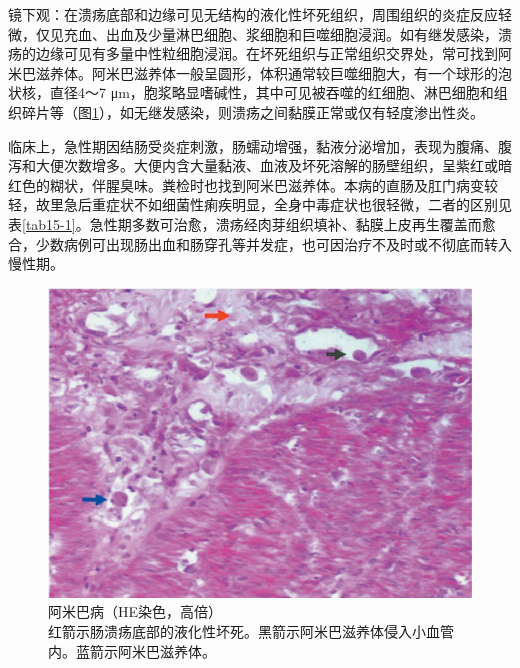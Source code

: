 镜下观：在溃疡底部和边缘可见无结构的液化性坏死组织，周围组织的炎症反应轻微，仅见充血、出血及少量淋巴细胞、浆细胞和巨噬细胞浸润。如有继发感染，溃疡的边缘可见有多量中性粒细胞浸润。在坏死组织与正常组织交界处，常可找到阿米巴滋养体。阿米巴滋养体一般呈圆形，体积通常较巨噬细胞大，有一个球形的泡状核，直径4～7
μm，胞浆略显嗜碱性，其中可见被吞噬的红细胞、淋巴细胞和组织碎片等（图\ref{fig15-2}），如无继发感染，则溃疡之间黏膜正常或仅有轻度渗出性炎。

临床上，急性期因结肠受炎症刺激，肠蠕动增强，黏液分泌增加，表现为腹痛、腹泻和大便次数增多。大便内含大量黏液、血液及坏死溶解的肠壁组织，呈紫红或暗红色的糊状，伴腥臭味。粪检时也找到阿米巴滋养体。本病的直肠及肛门病变较轻，故里急后重症状不如细菌性痢疾明显，全身中毒症状也很轻微，二者的区别见表\ref{tab15-1}。急性期多数可治愈，溃疡经肉芽组织填补、黏膜上皮再生覆盖而愈合，少数病例可出现肠出血和肠穿孔等并发症，也可因治疗不及时或不彻底而转入慢性期。

\begin{figure}[!htbp]
 \centering
 \includegraphics{./images/Image00245.jpg}
 \captionsetup{justification=centering}
 \caption{阿米巴病（HE染色，高倍）\\ {\small 红箭示肠溃疡底部的液化性坏死。黑箭示阿米巴滋养体侵入小血管内。蓝箭示阿米巴滋养体。}}
\label{fig15-2}
  \end{figure}

